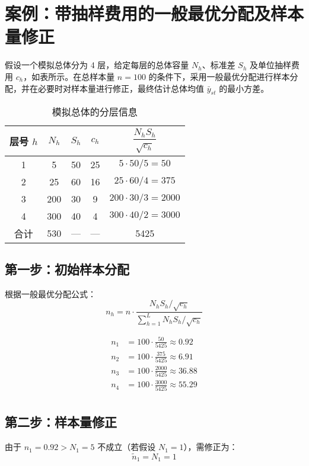 \documentclass[cn,hazy,blue,12pt,normal]{elegantnote}
\begin{document}
\section*{案例：带抽样费用的一般最优分配及样本量修正}

假设一个模拟总体分为 4 层，给定每层的总体容量 $N_h$、标准差 $S_h$ 及单位抽样费用 $c_h$，如表所示。在总样本量 $n = 100$ 的条件下，采用一般最优分配进行样本分配，并在必要时对样本量进行修正，最终估计总体均值 $\bar{y}_{st}$ 的最小方差。

\begin{table}[H]
\centering
\caption{模拟总体的分层信息}
\begin{tabular}{ccccc}
\toprule
层号 $h$ & $N_h$ & $S_h$ & $c_h$ & $\dfrac{N_h S_h}{\sqrt{c_h}}$ \\
\midrule
1 & 5   & 50  & 25 & $5 \cdot 50 / 5 = 50$ \\
2 & 25  & 60  & 16 & $25 \cdot 60 / 4 = 375$ \\
3 & 200 & 30  & 9  & $200 \cdot 30 / 3 = 2000$ \\
4 & 300 & 40  & 4  & $300 \cdot 40 / 2 = 3000$ \\
\midrule
合计 & 530 & — & — & 5425 \\
\bottomrule
\end{tabular}
\end{table}

\subsection*{第一步：初始样本分配}

根据一般最优分配公式：
\[
n_h = n \cdot \frac{N_h S_h / \sqrt{c_h}}{\sum_{h=1}^L N_h S_h / \sqrt{c_h}}
\]

\begin{align*}
n_1 &= 100 \cdot \frac{50}{5425} \approx 0.92 \\
n_2 &= 100 \cdot \frac{375}{5425} \approx 6.91 \\
n_3 &= 100 \cdot \frac{2000}{5425} \approx 36.88 \\
n_4 &= 100 \cdot \frac{3000}{5425} \approx 55.29 \\
\end{align*}

\subsection*{第二步：样本量修正}

由于 $n_1 = 0.92 > N_1 = 5$ 不成立（若假设 $N_1 = 1$），需修正为：
\[
\tilde{n}_1 = N_1 = 1
\]
\end{document}
